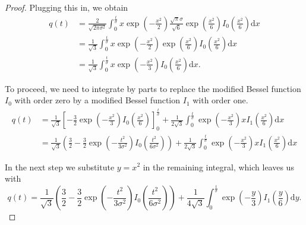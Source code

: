 \documentclass[a4paper,12pt]{article}
\theoremstyle{plain}
\theoremstyle{definition}
\begin{document}
\begin{proof}
	Plugging this in, we obtain
	\begin{align*}
		q(t) &= \frac{2}{\sqrt{2 \pi \sigma^2}} \int_0^\frac{t}{\sigma} x \exp \left( - \frac{x^2}{2} \right) \frac{\sqrt{\pi} \sigma}{\sqrt{6}} \exp \left( \frac{x^2}{6} \right) I_0 \left( \frac{x^2}{6} \right) \mathrm{d}x \\
		&= \frac{1}{\sqrt{3}} \int_0^\frac{t}{\sigma} x \exp \left( - \frac{x^2}{2} \right) \exp \left( \frac{x^2}{6} \right) I_0 \left( \frac{x^2}{6} \right) \mathrm{d}x \\
		&= \frac{1}{\sqrt{3}} \int_0^\frac{t}{\sigma} x \exp \left( - \frac{x^2}{3} \right) I_0 \left( \frac{x^2}{6} \right) \mathrm{d}x.
	\end{align*}
	
	To proceed, we need to integrate by parts to replace the modified Bessel function $I_0$ with order zero by a modified Bessel function $I_1$ with order one.
	\begin{align*}
		q(t) &= \frac{1}{\sqrt{3}} \left[ - \frac{3}{2} \exp \left( - \frac{x^2}{3} \right) I_0 \left( \frac{x^2}{6} \right) \right]_0^\frac{t}{\sigma} + \frac{1}{2 \sqrt{3}} \int_0^\frac{t}{\sigma} \exp \left( - \frac{x^2}{3} \right) x I_1 \left( \frac{x^2}{6} \right) \mathrm{d}x \\
		&= \frac{1}{\sqrt{3}} \left( \frac{3}{2} - \frac{3}{2} \exp \left( - \frac{t^2}{3 \sigma^2} \right) I_0 \left( \frac{t^2}{6 \sigma^2} \right) \right) + \frac{1}{2 \sqrt{3}} \int_0^\frac{t}{\sigma} \exp \left( - \frac{x^2}{3} \right) x I_1 \left( \frac{x^2}{6} \right) \mathrm{d}x
	\end{align*}
	
	In the next step we substitute $y = x^2$ in the remaining integral, which leaves us with
	\begin{equation*}
		q(t) = \frac{1}{\sqrt{3}} \left( \frac{3}{2} - \frac{3}{2} \exp \left( - \frac{t^2}{3 \sigma^2} \right) I_0 \left( \frac{t^2}{6 \sigma^2} \right) \right) + \frac{1}{4 \sqrt{3}} \int_0^\frac{t}{\sigma} \exp \left( - \frac{y}{3} \right) I_1 \left( \frac{y}{6} \right) \mathrm{d}y.
	\end{equation*}
	

\end{proof}
\end{document}
